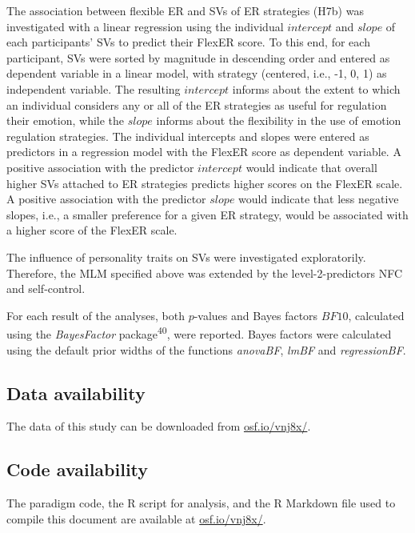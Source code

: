 \documentclass[
  man,floatsintext]{apa6}
\begin{document}
The association between flexible ER and SVs of ER strategies (H7b) was investigated with a linear regression using the individual \(intercept\) and \(slope\) of each participants' SVs to predict their FlexER score.
To this end, for each participant, SVs were sorted by magnitude in descending order and entered as dependent variable in a linear model, with strategy (centered, i.e., -1, 0, 1) as independent variable.
The resulting \(intercept\) informs about the extent to which an individual considers any or all of the ER strategies as useful for regulation their emotion, while the \(slope\) informs about the flexibility in the use of emotion regulation strategies.
The individual intercepts and slopes were entered as predictors in a regression model with the FlexER score as dependent variable.
A positive association with the predictor \(intercept\) would indicate that overall higher SVs attached to ER strategies predicts higher scores on the FlexER scale.
A positive association with the predictor \(slope\) would indicate that less negative slopes, i.e., a smaller preference for a given ER strategy, would be associated with a higher score of the FlexER scale.

The influence of personality traits on SVs were investigated exploratorily.
Therefore, the MLM specified above was extended by the level-2-predictors NFC and self-control.

For each result of the analyses, both \(p\)-values and Bayes factors \(BF10\), calculated using the \emph{BayesFactor} package\textsuperscript{40}, were reported.
Bayes factors were calculated using the default prior widths of the functions \emph{anovaBF}, \emph{lmBF} and \emph{regressionBF}.

\hypertarget{data-availability}{%
\subsection{Data availability}\label{data-availability}}

The data of this study can be downloaded from \href{https://osf.io/vnj8x/}{osf.io/vnj8x/}.

\hypertarget{code-availability}{%
\subsection{Code availability}\label{code-availability}}

The paradigm code, the R script for analysis, and the R Markdown file used to compile this document are available at \href{https://osf.io/vnj8x/}{osf.io/vnj8x/}.
\end{document}
